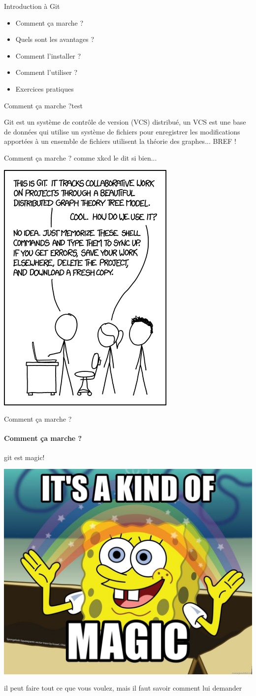\documentclass[usenames,dvipsnames]{beamer}
\begin{document}
\begin{frame}[fragile]{Introduction à Git}
	\begin{itemize}
		\item Comment ça marche ?
		\item Quels sont les avantages ?
		\item Comment l'installer ?
		\item Comment l'utiliser ?
		\item Exercices pratiques
	\end{itemize}
\end{frame}


\begin{frame}[fragile]{Comment ça marche ?}{test}
	
	Git est un système de contrôle de version (VCS) distribué, un VCS est une base de données qui utilise un système de fichiers pour enregistrer les modifications apportées à un ensemble de fichiers utilisent la théorie des graphes... BREF !
\end{frame}

\begin{frame}[fragile]{Comment ça marche ?}
	comme xkcd le dit si bien...
	\begin{center}
		\includegraphics[width=0.4\linewidth]{Im/git_xkcd.png}
	\end{center}
\end{frame}

\begin{frame}[fragile]{Comment ça marche ?}
	\framesubtitle{Comment ça marche ?}
	
	git est magic!
	\begin{center}
		\includegraphics[width=0.4\linewidth]{Im/its-a-kind-of-magic.jpg}
	\end{center}

	il peut faire tout ce que vous voulez, mais il faut savoir comment lui demander

\end{frame}
\end{document}
